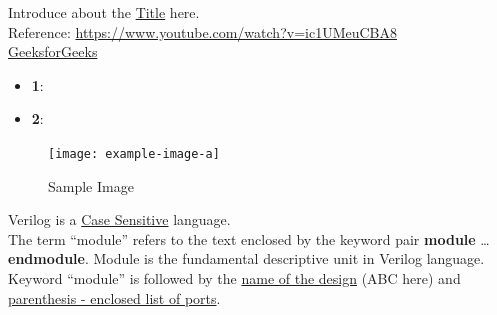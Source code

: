 \documentclass[12pt, a4paper]{article}
\begin{document}
Introduce about the \underline{Title} here. \\

Reference: \url{https://www.youtube.com/watch?v=ic1UMeuCBA8} \\
\href{https://www.geeksforgeeks.org/difference-between-gate-level-and-structural-verilog-hdl/}{GeeksforGeeks}

\begin{itemize}
    \item \textbf{1}: 
    \item \textbf{2}:
\end{itemize}

\begin{figure}[h]   %
    \centering
    \texttt{[image: example-image-a]} %
    \caption{Sample Image}%
    \label{fig:veri1}
\end{figure}

Verilog is a \underline{Case Sensitive} language. \\
The term ``module'' refers to the text enclosed by the keyword pair \textbf{module} \ldots \textbf{endmodule}. Module is the fundamental descriptive unit in Verilog language. \\
Keyword ``module'' is followed by the \underline{name of the design} (ABC here) and \uline{parenthesis - enclosed list of ports}.\\
\end{document}
